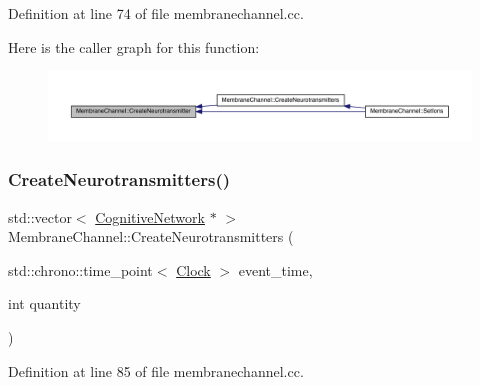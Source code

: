 Definition at line 74 of file membranechannel.\+cc.

Here is the caller graph for this function\+:\nopagebreak
\begin{figure}[H]
\begin{center}
\leavevmode
\includegraphics[width=350pt]{class_membrane_channel_aa8e78a1b0dd7c6b81cac09d33f01e6c2_icgraph}
\end{center}
\end{figure}
\mbox{\label{class_membrane_channel_a24c791e6cfd906d49e0ceb8a24eeb4cb}} 
\subsubsection{\texorpdfstring{Create\+Neurotransmitters()}{CreateNeurotransmitters()}}
{\footnotesize\ttfamily std\+::vector$<$ \hyperlink{class_cognitive_network}{Cognitive\+Network} $\ast$ $>$ Membrane\+Channel\+::\+Create\+Neurotransmitters (\begin{DoxyParamCaption}\item[{std\+::chrono\+::time\+\_\+point$<$ \hyperlink{universe_8h_a0ef8d951d1ca5ab3cfaf7ab4c7a6fd80}{Clock} $>$}]{event\+\_\+time,  }\item[{int}]{quantity }\end{DoxyParamCaption})}



Definition at line 85 of file membranechannel.\+cc.

